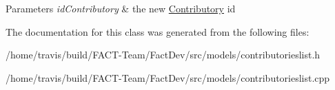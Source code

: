 \begin{DoxyParams}{Parameters}
{\em id\-Contributory} & the new \hyperlink{classModels_1_1Contributory}{Contributory} id \\
\hline
\end{DoxyParams}


The documentation for this class was generated from the following files\-:\begin{DoxyCompactItemize}
\item 
/home/travis/build/\-F\-A\-C\-T-\/\-Team/\-Fact\-Dev/src/models/contributorieslist.\-h\item 
/home/travis/build/\-F\-A\-C\-T-\/\-Team/\-Fact\-Dev/src/models/contributorieslist.\-cpp\end{DoxyCompactItemize}
